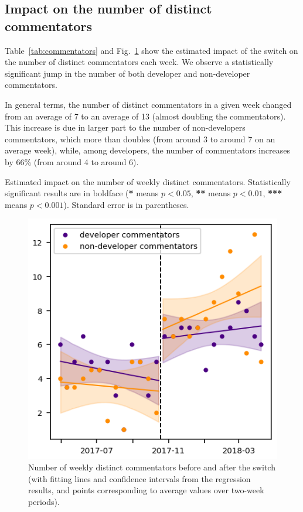 \documentclass[conference]{IEEEtran}
\begin{document}
\subsection{Impact on the number of distinct commentators}

Table~\ref{tab:commentators} and Fig.~\ref{commentator_nb_rd} show the estimated impact of the switch on the number of distinct commentators each week. We observe a statistically significant jump in the number of both developer and non-developer commentators. 

In general terms, the number of distinct commentators in a given week changed from an average of 7 to an average of 13 (almost doubling the commentators). This increase is due in larger part to the number of non-developers commentators, which more than doubles (from around 3 to around 7 on an average week), while, among developers, the number of commentators  increases by 66\% (from around 4 to around 6).

\begin{table}
\centering
\caption{Estimated impact on the number of weekly distinct commentators. Statistically significant results are in boldface (\textbf{*} means $p<0.05$, \textbf{**} means $p<0.01$, \textbf{***} means $p<0.001$). Standard error is in parentheses.}
\label{tab:commentators}

\end{table}


\begin{figure}
\includegraphics{commentator_nb_rd.png}
\caption{Number of weekly distinct commentators before and after the switch (with fitting lines and confidence intervals from the regression results, and points corresponding to average values over two-week periods).} \label{commentator_nb_rd}
\end{figure}
\end{document}
